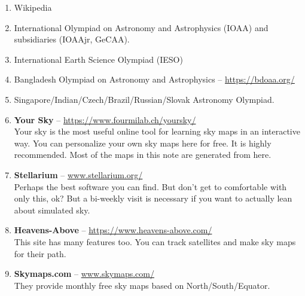 \documentclass[a4paper,12pt]{extarticle}
\begin{document}
\begin{enumerate}
    \item Wikipedia
    \item  International Olympiad on Astronomy and Astrophysics (IOAA) and subsidiaries (IOAAjr, GeCAA).
    \item International Earth Science Olympiad (IESO)
    \item Bangladesh Olympiad on Astronomy and Astrophysics -- \url{https://bdoaa.org/}
    \item Singapore/Indian/Czech/Brazil/Russian/Slovak Astronomy Olympiad. 
    \item \textbf{Your Sky} -- \url{https://www.fourmilab.ch/yoursky/}\\
Your sky is the most useful online tool for learning sky maps in an interactive way. You can personalize your own sky maps here for free. It is highly recommended. Most of the maps in this note are generated from here.
\item \textbf{Stellarium} -- \url{www.stellarium.org/}\\
Perhaps the best software you can find. But don’t get to comfortable with only this, ok? But a bi-weekly visit is necessary if you want to actually lean about simulated sky.
\item \textbf{Heavens-Above} -- \url{https://www.heavens-above.com/}\\
This site has many features too. You can track satellites and make sky maps for their path.
\item \textbf{Skymaps.com} -- \url{www.skymaps.com/}\\
They provide monthly free sky maps based on North/South/Equator.
\end{enumerate}
\end{document}
